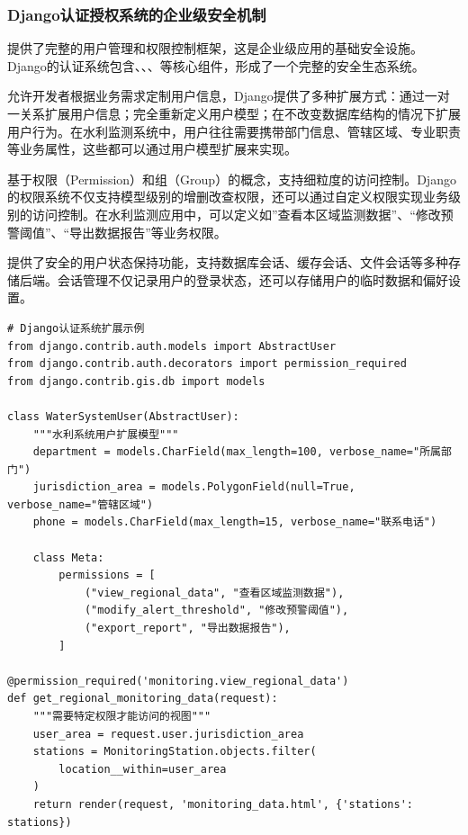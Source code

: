 \hypertarget{djangoux8ba4ux8bc1ux6388ux6743ux7cfbux7edfux7684ux4f01ux4e1aux7ea7ux5b89ux5168ux673aux5236}{%
\subsubsection{Django认证授权系统的企业级安全机制}\label{djangoux8ba4ux8bc1ux6388ux6743ux7cfbux7edfux7684ux4f01ux4e1aux7ea7ux5b89ux5168ux673aux5236}}

提供了完整的用户管理和权限控制框架，这是企业级应用的基础安全设施。Django的认证系统包含、、、等核心组件，形成了一个完整的安全生态系统。

允许开发者根据业务需求定制用户信息，Django提供了多种扩展方式：通过一对一关系扩展用户信息；完全重新定义用户模型；在不改变数据库结构的情况下扩展用户行为。在水利监测系统中，用户往往需要携带部门信息、管辖区域、专业职责等业务属性，这些都可以通过用户模型扩展来实现。

基于权限（Permission）和组（Group）的概念，支持细粒度的访问控制。Django的权限系统不仅支持模型级别的增删改查权限，还可以通过自定义权限实现业务级别的访问控制。在水利监测应用中，可以定义如''查看本区域监测数据''、``修改预警阈值''、``导出数据报告''等业务权限。

提供了安全的用户状态保持功能，支持数据库会话、缓存会话、文件会话等多种存储后端。会话管理不仅记录用户的登录状态，还可以存储用户的临时数据和偏好设置。

\begin{lstlisting}[style=python]
# Django认证系统扩展示例
from django.contrib.auth.models import AbstractUser
from django.contrib.auth.decorators import permission_required
from django.contrib.gis.db import models

class WaterSystemUser(AbstractUser):
    """水利系统用户扩展模型"""
    department = models.CharField(max_length=100, verbose_name="所属部门")
    jurisdiction_area = models.PolygonField(null=True, verbose_name="管辖区域")
    phone = models.CharField(max_length=15, verbose_name="联系电话")
    
    class Meta:
        permissions = [
            ("view_regional_data", "查看区域监测数据"),
            ("modify_alert_threshold", "修改预警阈值"),
            ("export_report", "导出数据报告"),
        ]

@permission_required('monitoring.view_regional_data')
def get_regional_monitoring_data(request):
    """需要特定权限才能访问的视图"""
    user_area = request.user.jurisdiction_area
    stations = MonitoringStation.objects.filter(
        location__within=user_area
    )
    return render(request, 'monitoring_data.html', {'stations': stations})
\end{lstlisting}

